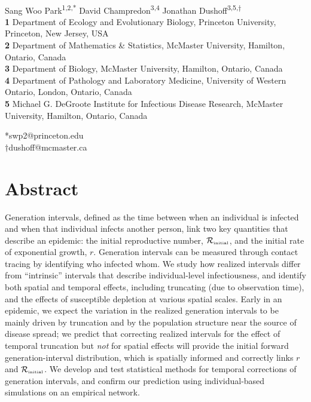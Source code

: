 \documentclass[12pt]{article}
\date{\today}
\newcommand{\Rx}[1]{\ensuremath{{\mathcal R}_{#1}}\xspace}
\newcommand{\Rini}{\Rx{\textrm{\tiny initial}}}
\begin{document}
\begin{flushleft}{
	\Large
	\textbf{}
}
\newline
\\
Sang Woo Park\textsuperscript{1,2,*}
David Champredon\textsuperscript{3,4}
Jonathan Dushoff\textsuperscript{3,5,$\dagger$}
\\

\bigskip
\textbf{1} Department of Ecology and Evolutionary Biology, Princeton University, Princeton, New Jersey, USA
\\
\textbf{2} Department of Mathematics \& Statistics, McMaster University, Hamilton, Ontario, Canada
\\
\textbf{3} Department of Biology, McMaster University, Hamilton, Ontario, Canada
\\
\textbf{4} Department of Pathology and Laboratory Medicine, University of Western Ontario, London, Ontario, Canada
\\
\textbf{5} Michael G. DeGroote Institute for Infectious Disease Research, McMaster University, Hamilton, Ontario, Canada
\\
\bigskip

*swp2@princeton.edu\\
$\dagger$dushoff@mcmaster.ca
\end{flushleft} 

\section*{Abstract}

Generation intervals, defined as the time between when an individual is infected and when that individual infects another person, link two key quantities that describe an epidemic: the initial reproductive number, $\Rini$, and the initial rate of exponential growth, $r$.
Generation intervals can be measured through contact tracing by identifying who infected whom.
We study how realized intervals differ from ``intrinsic'' intervals that describe individual-level infectiousness, and identify both spatial and temporal effects, including truncating (due to observation time), and the effects of susceptible depletion at various spatial scales.
Early in an epidemic, we expect the variation in the realized generation intervals to be mainly driven by truncation and by the population structure near the source of disease spread; 
we predict that correcting realized intervals for the effect of temporal truncation but \emph{not} for spatial effects will provide the initial forward generation-interval distribution, which is spatially informed and correctly links $r$ and $\Rini$.
We develop and test statistical methods for temporal corrections of generation intervals,
and confirm our prediction using individual-based simulations on an empirical network.
\end{document}
